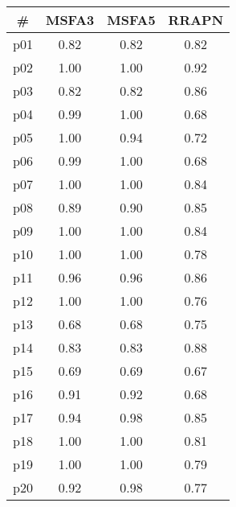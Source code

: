 \begin{tabular}{c||c|c|c}
\textbf{\#} & \textbf{MSFA3} & \textbf{MSFA5} & \textbf{RRAPN}\\
\hline
\hline
p01 & 0.82 & 0.82 & 0.82\\
p02 & 1.00 & 1.00 & 0.92\\
p03 & 0.82 & 0.82 & 0.86\\
p04 & 0.99 & 1.00 & 0.68\\
p05 & 1.00 & 0.94 & 0.72\\
p06 & 0.99 & 1.00 & 0.68\\
p07 & 1.00 & 1.00 & 0.84\\
p08 & 0.89 & 0.90 & 0.85\\
p09 & 1.00 & 1.00 & 0.84\\
p10 & 1.00 & 1.00 & 0.78\\
p11 & 0.96 & 0.96 & 0.86\\
p12 & 1.00 & 1.00 & 0.76\\
p13 & 0.68 & 0.68 & 0.75\\
p14 & 0.83 & 0.83 & 0.88\\
p15 & 0.69 & 0.69 & 0.67\\
p16 & 0.91 & 0.92 & 0.68\\
p17 & 0.94 & 0.98 & 0.85\\
p18 & 1.00 & 1.00 & 0.81\\
p19 & 1.00 & 1.00 & 0.79\\
p20 & 0.92 & 0.98 & 0.77\\
\end{tabular}

